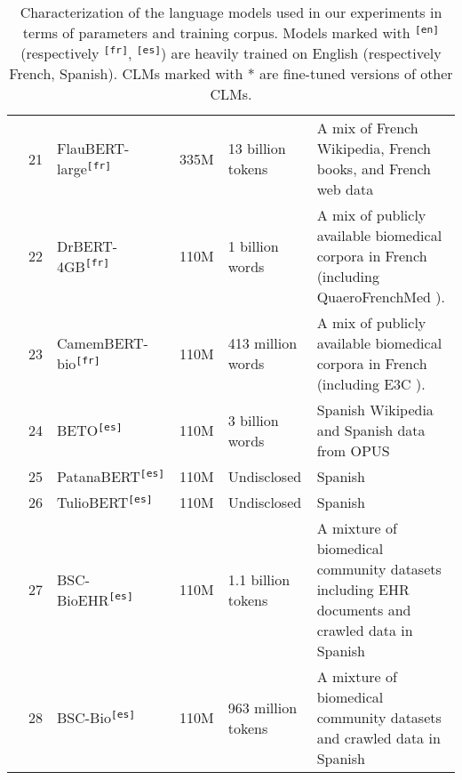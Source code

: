\begin{table*}[htbp]
{{\begin{tabular}{clp{7cm}rp{3cm}p{10cm}}
\cmidrule{2-6}
 & 21 & FlauBERT-large\textsuperscript{\texttt{[fr]}} \cite{le2019flaubert} & 335M & 13 billion tokens & A mix of French Wikipedia, French books, and French web data \\
\cmidrule{2-6}
 & 22 & DrBERT-4GB\textsuperscript{\texttt{[fr]}} \cite{labrak2023drbert} & 110M & 1 billion words & A mix of publicly available biomedical corpora in French (including QuaeroFrenchMed \cite{neveol2014quaero}). \\
\cmidrule{2-6}
 & 23 & CamemBERT-bio\textsuperscript{\texttt{[fr]}} \cite{touchent2023camembertbio} & 110M & 413 million words & A mix of publicly available biomedical corpora in French (including E3C \cite{magnini2021e3c}). \\
\cmidrule{2-6}
 & 24 & BETO\textsuperscript{\texttt{[es]}} \cite{canete2020beto} & 110M & 3 billion words & Spanish Wikipedia and Spanish data from OPUS \cite{tiedemann2012parallel} \\
\cmidrule{2-6}
 & 25 & PatanaBERT\textsuperscript{\texttt{[es]}} & 110M & Undisclosed & Spanish \\
\cmidrule{2-6}
 & 26 & TulioBERT\textsuperscript{\texttt{[es]}} & 110M & Undisclosed & Spanish \\
\cmidrule{2-6}
 & 27 & BSC-BioEHR\textsuperscript{\texttt{[es]}} \cite{carrino2022pretrained} & 110M & 1.1 billion tokens & A mixture of biomedical community datasets including EHR documents and crawled data in Spanish \\
\cmidrule{2-6}
 & 28 & BSC-Bio\textsuperscript{\texttt{[es]}} \cite{carrino2022pretrained} & 110M & 963 million tokens & A mixture of biomedical community datasets and crawled data in Spanish \\
\cmidrule{2-6}
\bottomrule
\end{tabular}}}
\caption{Characterization of the language models used in our experiments in terms of parameters and training corpus. Models marked with \textsuperscript{\texttt{[en]}} (respectively \textsuperscript{\texttt{[fr]}}, \textsuperscript{\texttt{[es]}}) are heavily trained on English (respectively French, Spanish). CLMs marked with * are fine-tuned versions of other CLMs.}
\label{tab:LM_features}
\end{table*}

